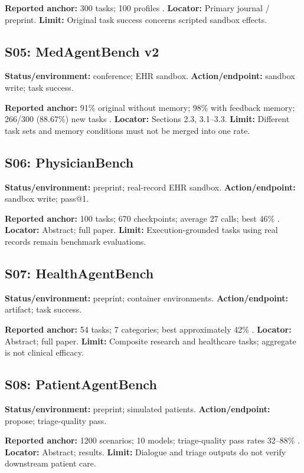 \documentclass[journal,10pt]{IEEEtran}
\begin{document}
\textbf{Reported anchor:} 300 tasks; 100 profiles \cite{medagentbench2025}. \textbf{Locator:} Primary journal / preprint. \textbf{Limit:} Original task success concerns scripted sandbox effects.

\subsection{S05: MedAgentBench v2}
\textbf{Status/environment:} conference; EHR sandbox. \textbf{Action/endpoint:} sandbox write; task success.

\textbf{Reported anchor:} 91\% original without memory; 98\% with feedback memory; 266/300 (88.67\%) new tasks \cite{medagentbenchv2}. \textbf{Locator:} Sections 2.3, 3.1--3.3. \textbf{Limit:} Different task sets and memory conditions must not be merged into one rate.

\subsection{S06: PhysicianBench}
\textbf{Status/environment:} preprint; real-record EHR sandbox. \textbf{Action/endpoint:} sandbox write; pass@1.

\textbf{Reported anchor:} 100 tasks; 670 checkpoints; average 27 calls; best 46\% \cite{physicianbench2026}. \textbf{Locator:} Abstract; full paper. \textbf{Limit:} Execution-grounded tasks using real records remain benchmark evaluations.

\subsection{S07: HealthAgentBench}
\textbf{Status/environment:} preprint; container environments. \textbf{Action/endpoint:} artifact; task success.

\textbf{Reported anchor:} 54 tasks; 7 categories; best approximately 42\% \cite{healthagentbench2026}. \textbf{Locator:} Abstract; full paper. \textbf{Limit:} Composite research and healthcare tasks; aggregate is not clinical efficacy.

\subsection{S08: PatientAgentBench}
\textbf{Status/environment:} preprint; simulated patients. \textbf{Action/endpoint:} propose; triage-quality pass.

\textbf{Reported anchor:} 1200 scenarios; 10 models; triage-quality pass rates 32--88\% \cite{patientagentbench2026}. \textbf{Locator:} Abstract; results. \textbf{Limit:} Dialogue and triage outputs do not verify downstream patient care.
\end{document}
